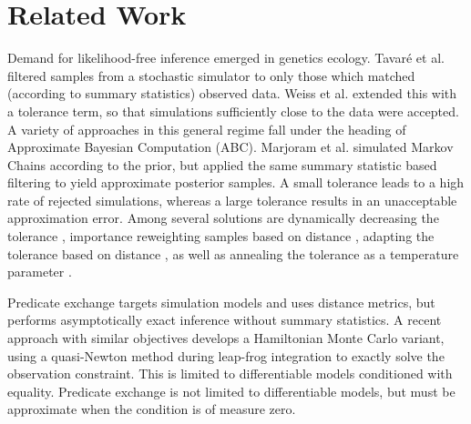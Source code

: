 \section{Related Work}

Demand for likelihood-free inference emerged in genetics ecology.
Tavar{\'e} et al.  
filtered samples from a stochastic simulator to only those which matched (according to summary statistics) observed data. 
Weiss et al.  extended this with a tolerance term, so that simulations sufficiently close to the data were accepted.
A variety of approaches in this general regime  \cite{beaumont2002approximate,sisson2007sequential} fall under the heading of Approximate Bayesian Computation (ABC).
Marjoram et al.  simulated Markov Chains according to the prior, but applied the same summary statistic based filtering to yield approximate posterior samples.
A small tolerance leads to a high rate of rejected simulations, whereas a large tolerance results in an unacceptable approximation error.
Among several solutions are dynamically decreasing the tolerance \cite{toni2008approximate}, importance reweighting samples based on distance \cite{wegmann2009efficient}, adapting the tolerance based on distance \cite{del2012adaptive,lenormand2013adaptive}, as well as annealing the tolerance as a temperature parameter \cite{albert2015simulated}.



Predicate exchange targets simulation models and uses distance metrics, but performs asymptotically exact inference without summary statistics.
A recent approach \cite{graham2017asymptotically}  with similar objectives develops a Hamiltonian Monte Carlo variant, using a quasi-Newton method during leap-frog integration to exactly solve the observation constraint.
This is limited to differentiable models conditioned with equality.
Predicate exchange is not limited to differentiable models, but must be approximate when the condition is of measure zero.

